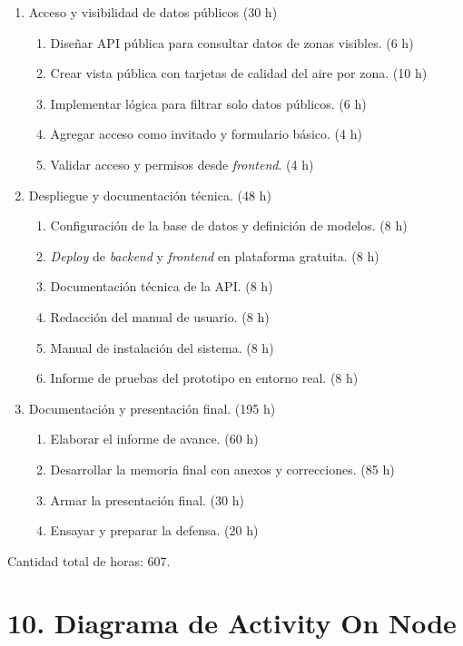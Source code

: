 \documentclass[
11pt, %
]{charter}
\begin{document}
\begin{enumerate}
    \item Acceso y visibilidad de datos públicos (30 h)
    \begin{enumerate}
        \item Diseñar API pública para consultar datos de zonas visibles. (6 h)
        \item Crear vista pública con tarjetas de calidad del aire por zona. (10 h)
        \item Implementar lógica para filtrar solo datos públicos. (6 h)
        \item Agregar acceso como invitado y formulario básico. (4 h)
        \item Validar acceso y permisos desde \textit{frontend}. (4 h)
    \end{enumerate}

    \item Despliegue y documentación técnica. (48 h)
    \begin{enumerate}
        \item Configuración de la base de datos y definición de modelos. (8 h)
        \item \textit{Deploy} de \textit{backend} y \textit{frontend} en plataforma gratuita. (8 h)
        \item Documentación técnica de la API. (8 h)
        \item Redacción del manual de usuario. (8 h)
        \item Manual de instalación del sistema. (8 h)
        \item Informe de pruebas del prototipo en entorno real. (8 h)
    \end{enumerate}

    \item Documentación y presentación final. (195 h)
    \begin{enumerate}
        \item Elaborar el informe de avance. (60 h)
        \item Desarrollar la memoria final con anexos y correcciones. (85 h)
        \item Armar la presentación final. (30 h)
        \item Ensayar y preparar la defensa. (20 h)
    \end{enumerate}
\end{enumerate}

Cantidad total de horas: 607.


\section{10. Diagrama de Activity On Node}
\label{sec:AoN}
\end{document}
